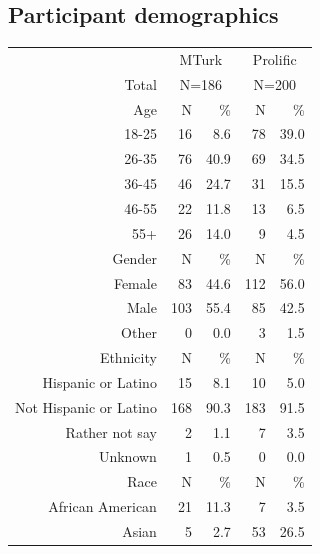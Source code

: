\documentclass[a4paper,notitlepage,12pt]{article}
\begin{document}
\begin{refsection}[supp]
\subsection*{Participant demographics}
\begin{table}[!h]
    \centering
    \small
    \setlength{\tabcolsep}{15pt}
    \begin{tabular}{ rrrrr }
        \toprule
        & \multicolumn{2}{c}{MTurk} & \multicolumn{2}{c}{Prolific} \\
        \cmidrule(lr){2-3} \cmidrule(lr){4-5}
        Total & \multicolumn{2}{c}{N=186} & \multicolumn{2}{c}{N=200} \\
        \midrule
        Age & N & \% & N & \% \\
        \cmidrule(lr){1-5}
        18-25   &      16 &   8.6 &       78 &  39.0 \\
        26-35   &      76 &  40.9 &       69 &  34.5 \\
        36-45   &      46 &  24.7 &       31 &  15.5 \\
        46-55   &      22 &  11.8 &       13 &   6.5 \\
        55+     &      26 &  14.0 &        9 &   4.5 \\
        \midrule
        Gender & N & \% & N & \% \\
        \cmidrule(lr){1-5}
        Female             &    83 &  44.6 &    112 &  56.0 \\
        Male               &   103 &  55.4 &     85 &  42.5 \\
        Other              &     0 &   0.0 &      3 &   1.5 \\
        \midrule
        Ethnicity & N & \% & N & \% \\
        \cmidrule(lr){1-5}
        Hispanic or Latino     &    15 &   8.1 &     10 &   5.0 \\
        Not Hispanic or Latino &   168 &  90.3 &    183 &  91.5 \\
        Rather not say         &     2 &   1.1 &      7 &   3.5 \\
        Unknown                &     1 &   0.5 &      0 &   0.0 \\
        \midrule
        Race & N & \% & N & \% \\
        \cmidrule(lr){1-5}
        African American                 &    21 &  11.3 &      7 &   3.5 \\
        Asian                                     &     5 &   2.7 &     53 &  26.5 \\

\end{tabular}
\end{table}
\end{refsection}
\end{document}
